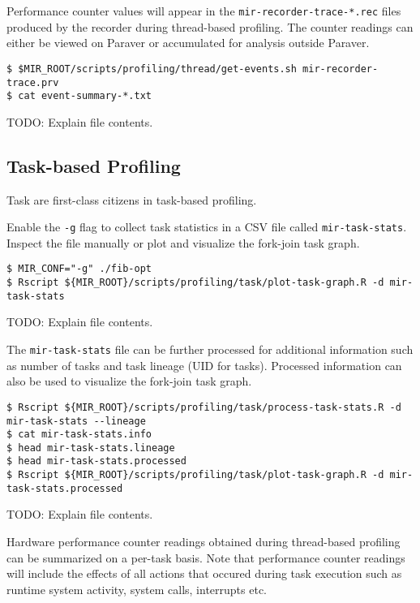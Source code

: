 \documentclass[11pt,a4paper]{article}
\begin{document}
Performance counter values will appear in the \texttt{mir-recorder-trace-*.rec} files produced by the recorder during thread-based profiling. The counter readings can either be viewed on Paraver or accumulated for analysis outside Paraver.

\begin{lstlisting}[style=MyInputStyle]
$ $MIR_ROOT/scripts/profiling/thread/get-events.sh mir-recorder-trace.prv
$ cat event-summary-*.txt
\end{lstlisting}

TODO: Explain file contents.

\subsection{Task-based Profiling}\label{task-based-profiling}

Task are first-class citizens in task-based profiling.

Enable the \texttt{-g} flag to collect task statistics in a CSV file called \texttt{mir-task-stats}. Inspect the file manually or plot and visualize the fork-join task graph.

\begin{lstlisting}[style=MyInputStyle]
$ MIR_CONF="-g" ./fib-opt
$ Rscript ${MIR_ROOT}/scripts/profiling/task/plot-task-graph.R -d mir-task-stats
\end{lstlisting}

TODO: Explain file contents.

The \texttt{mir-task-stats} file can be further processed for additional information such as number of tasks and task lineage (UID for tasks). Processed information can also be used to visualize the fork-join task graph.

\begin{lstlisting}[style=MyInputStyle]
$ Rscript ${MIR_ROOT}/scripts/profiling/task/process-task-stats.R -d mir-task-stats --lineage
$ cat mir-task-stats.info
$ head mir-task-stats.lineage
$ head mir-task-stats.processed
$ Rscript ${MIR_ROOT}/scripts/profiling/task/plot-task-graph.R -d mir-task-stats.processed
\end{lstlisting}

TODO: Explain file contents.

Hardware performance counter readings obtained during thread-based profiling can be summarized on a per-task basis. Note that performance counter readings will include the effects of all actions that occured during task execution such as runtime system activity, system calls, interrupts etc.
\end{document}
